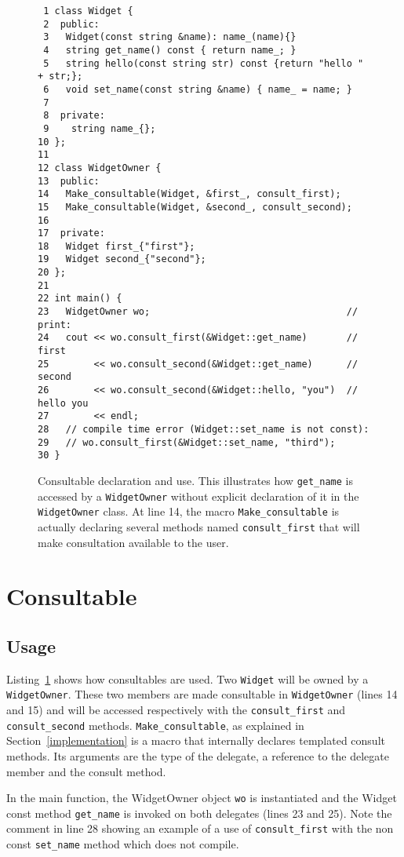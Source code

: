 \documentclass{article}
\begin{document}
\begin{figure}[ht]
{\small
\begin{lstlisting}
 1 class Widget {
 2  public:
 3   Widget(const string &name): name_(name){}
 4   string get_name() const { return name_; }
 5   string hello(const string str) const {return "hello " + str;};
 6   void set_name(const string &name) { name_ = name; }
 7 
 8  private:
 9    string name_{};
10 };
11 
12 class WidgetOwner {
13  public:
14   Make_consultable(Widget, &first_, consult_first);
15   Make_consultable(Widget, &second_, consult_second);
16 
17  private:
18   Widget first_{"first"};
19   Widget second_{"second"};
20 };
21 
22 int main() {
23   WidgetOwner wo;                                   // print:
24   cout << wo.consult_first(&Widget::get_name)       // first
25        << wo.consult_second(&Widget::get_name)      // second
26        << wo.consult_second(&Widget::hello, "you")  // hello you
27        << endl;
28   // compile time error (Widget::set_name is not const):
29   // wo.consult_first(&Widget::set_name, "third");
30 }
\end{lstlisting}}
\cprotect\caption{Consultable declaration and use. This illustrates how \verb+get_name+ is accessed by a \verb+WidgetOwner+ without explicit declaration of it in the \verb+WidgetOwner+ class. At line 14, the macro \verb+Make_consultable+ is actually declaring several methods named \verb+consult_first+ that will make consultation available to the user.}
\label{example:basic}
\end{figure}


\section{Consultable}
\subsection{Usage}

Listing~\ref{example:basic} shows how consultables are used. Two \verb+Widget+ will be owned by a \verb+WidgetOwner+. These two members are made consultable in \verb+WidgetOwner+ (lines 14 and 15) and will be accessed respectively with the \verb+consult_first+ and \verb+consult_second+ methods. \verb+Make_consultable+, as explained in Section~\ref{implementation} is a macro that internally declares templated consult methods. Its arguments are the type of the delegate, a reference to the delegate member and the consult method. 

In the main function, the WidgetOwner object \verb+wo+ is instantiated and the Widget const method \verb+get_name+ is invoked on both delegates (lines 23 and 25). Note the comment in line 28 showing an example of a use of \verb+consult_first+ with the non const \verb+set_name+ method which does not compile. 
\end{document}
